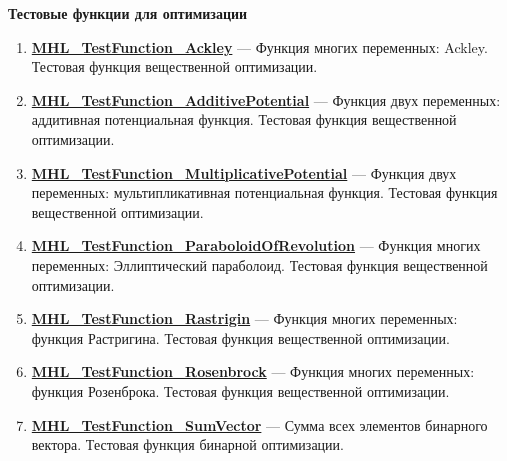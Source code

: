 \documentclass[a4paper,12pt]{article}
\begin{document}
\textbf{Тестовые функции для оптимизации}
\begin{enumerate}

\item \textbf{\hyperref[MHL_TestFunction_Ackley]{MHL\_TestFunction\_Ackley}} --- Функция многих переменных: Ackley. Тестовая функция вещественной оптимизации.

\item \textbf{\hyperref[MHL_TestFunction_AdditivePotential]{MHL\_TestFunction\_AdditivePotential}} --- Функция двух переменных: аддитивная потенциальная функция. Тестовая функция вещественной оптимизации.

\item \textbf{\hyperref[MHL_TestFunction_MultiplicativePotential]{MHL\_TestFunction\_MultiplicativePotential}} --- Функция двух переменных: мультипликативная потенциальная функция. Тестовая функция вещественной оптимизации.

\item \textbf{\hyperref[MHL_TestFunction_ParaboloidOfRevolution]{MHL\_TestFunction\_ParaboloidOfRevolution}} --- Функция многих переменных: Эллиптический параболоид. Тестовая функция вещественной оптимизации.

\item \textbf{\hyperref[MHL_TestFunction_Rastrigin]{MHL\_TestFunction\_Rastrigin}} --- Функция многих переменных: функция Растригина. Тестовая функция вещественной оптимизации.

\item \textbf{\hyperref[MHL_TestFunction_Rosenbrock]{MHL\_TestFunction\_Rosenbrock}} --- Функция многих переменных: функция Розенброка. Тестовая функция вещественной оптимизации.

\item \textbf{\hyperref[MHL_TestFunction_SumVector]{MHL\_TestFunction\_SumVector}} --- Сумма всех элементов бинарного вектора. Тестовая функция бинарной оптимизации.

\end{enumerate}
\end{document}
